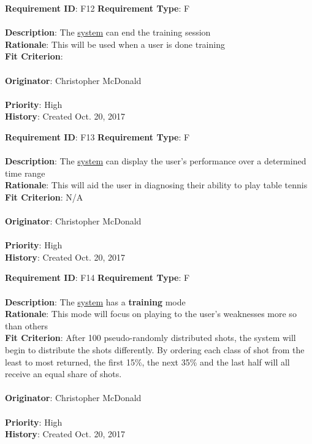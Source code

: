 \documentclass[11pt]{article}
\begin{document}
\begin{framed}
	\noindent\textbf{Requirement ID}: F12 \hfill \textbf{Requirement Type}: F \hfill\\\\
	\noindent\textbf{Description}: The \hyperref[sec:definitions]{system} can end the training session \\
	\textbf{Rationale}: This will be used when a user is done training \\
	\textbf{Fit Criterion}: \\\\
	\textbf{Originator}: Christopher McDonald \\\\
	\textbf{Priority}: High \hfill \\
	\noindent\textbf{History}: Created Oct. 20, 2017
\end{framed}

\begin{framed}
	\noindent\textbf{Requirement ID}: F13 \hfill \textbf{Requirement Type}: F \hfill\\\\
	\noindent\textbf{Description}: The \hyperref[sec:definitions]{system} can display the user's performance over a determined time range \\
	\textbf{Rationale}: This will aid the user in diagnosing their ability to play table tennis \\
	\textbf{Fit Criterion}: N/A\\\\
	\textbf{Originator}: Christopher McDonald \\\\
	\textbf{Priority}: High \hfill \\
	\noindent\textbf{History}: Created Oct. 20, 2017
\end{framed}

\begin{framed}
	\noindent\textbf{Requirement ID}: F14 \hfill \textbf{Requirement Type}: F \hfill\\\\
	\noindent\textbf{Description}: The \hyperref[sec:definitions]{system} has a \textbf{training} mode \\
	\textbf{Rationale}: This mode will focus on playing to the user's weaknesses more so than others \\
	\textbf{Fit Criterion}: After 100 pseudo-randomly distributed shots, the system will begin to distribute the shots differently. By ordering each class of shot from the least to most returned, the first 15\%, the next 35\% and the last half will all receive an equal share of shots. \\\\
	\textbf{Originator}: Christopher McDonald \\\\
	\textbf{Priority}: High \hfill \\
	\noindent\textbf{History}: Created Oct. 20, 2017
\end{framed}
\end{document}
